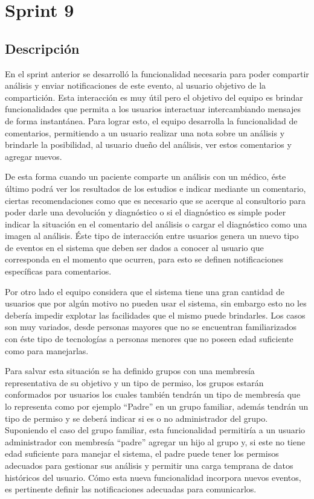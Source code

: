 \section{Sprint 9} %



\subsection{Descripción}

En el sprint anterior se desarrolló la funcionalidad necesaria para poder compartir análisis y enviar notificaciones de este evento, al usuario objetivo de la compartición. Esta interacción es muy útil pero el objetivo del equipo es brindar funcionalidades que permita a los usuarios interactuar intercambiando mensajes de forma instantánea. Para lograr esto, el equipo desarrolla la funcionalidad de comentarios, permitiendo a un usuario realizar una nota sobre un análisis y brindarle la posibilidad, al usuario dueño del análisis, ver estos comentarios y agregar nuevos. 

De esta forma cuando un paciente comparte un análisis con un médico, éste último podrá ver los resultados de los estudios e indicar mediante un comentario, ciertas recomendaciones como que es necesario que se acerque al consultorio para poder darle una devolución y diagnóstico o si el diagnóstico es simple poder indicar la situación en el comentario del análisis o cargar el diagnóstico como una imagen al análisis. Éste tipo de interacción entre usuarios genera un nuevo tipo de eventos en el sistema que deben ser dados a conocer al usuario que corresponda en el momento que ocurren, para esto se definen notificaciones específicas para comentarios.

Por otro lado el equipo considera que el sistema tiene una gran cantidad de usuarios que por algún motivo no pueden usar el sistema, sin embargo esto no les debería impedir explotar las facilidades que el mismo puede brindarles. Los casos son muy variados, desde personas mayores que no se encuentran familiarizados con éste tipo de tecnologías a personas menores que no poseen edad suficiente como para manejarlas. 

Para salvar esta situación se ha definido grupos con una membresía representativa de su objetivo y un tipo de permiso, los grupos estarán conformados por usuarios los cuales también tendrán un tipo de membresía que lo representa como por ejemplo ``Padre'' en un grupo familiar, además tendrán un tipo de permiso y se deberá indicar si es o no administrador del grupo. Suponiendo el caso del grupo familiar, esta funcionalidad permitiría a un usuario administrador con membresía ``padre'' agregar un hijo al grupo y, si este no tiene edad suficiente para manejar el sistema, el padre puede tener los permisos adecuados para gestionar sus análisis y permitir una carga temprana de datos históricos del usuario. Cómo esta nueva funcionalidad incorpora nuevos eventos, es pertinente definir las notificaciones adecuadas para comunicarlos.


